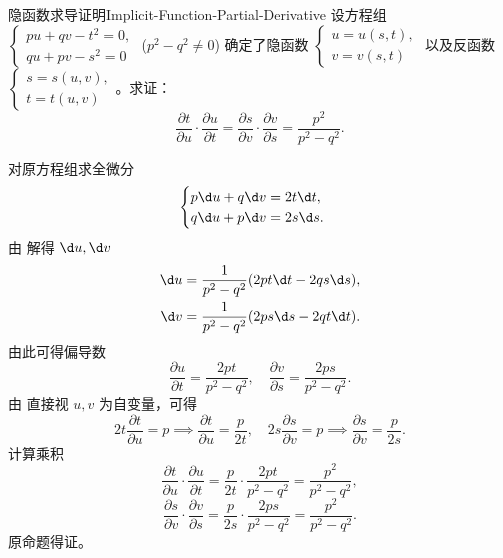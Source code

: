 \begin{problem}{隐函数求导证明}{Implicit-Function-Partial-Derivative}
    设方程组 $\begin{cases} pu + qv - t^2 = 0, \\ qu + pv - s^2 = 0 \end{cases}$ ($p^2 - q^2 \neq 0$) 确定了隐函数 $\begin{cases} u = u(s, t), \\ v = v(s, t) \end{cases}$ 以及反函数 $\begin{cases} s = s(u, v), \\ t = t(u, v) \end{cases}$。求证：
    \begin{equation}
        \frac{\partial t}{\partial u} \cdot \frac{\partial u}{\partial t} = \frac{\partial s}{\partial v} \cdot \frac{\partial v}{\partial s} = \frac{p^2}{p^2 - q^2}.
    \end{equation}
\end{problem}

\begin{myproof}
    对原方程组求全微分
    \begin{equation}
        \label{eq:diff-system}
        \begin{cases}
            p \d u + q \d v = 2t \d t, \\
            q \d u + p \d v = 2s \d s.
        \end{cases}
    \end{equation}
    由  解得 $\d u, \d v$
    \begin{equation}
        \begin{aligned}
            \d u & = \frac{1}{p^2 - q^2} (2pt \d t - 2qs \d s), \\
            \d v & = \frac{1}{p^2 - q^2} (2ps \d s - 2qt \d t).
        \end{aligned}
    \end{equation}
    由此可得偏导数
    \begin{equation}
        \frac{\partial u}{\partial t} = \frac{2pt}{p^2 - q^2}, \quad \frac{\partial v}{\partial s} = \frac{2ps}{p^2 - q^2}.
    \end{equation}
    由  直接视 $u, v$ 为自变量，可得
    \begin{equation}
        2t \frac{\partial t}{\partial u} = p \implies \frac{\partial t}{\partial u} = \frac{p}{2t}, \quad 2s \frac{\partial s}{\partial v} = p \implies \frac{\partial s}{\partial v} = \frac{p}{2s}.
    \end{equation}
    计算乘积
    \begin{equation}
        \frac{\partial t}{\partial u} \cdot \frac{\partial u}{\partial t} = \frac{p}{2t} \cdot \frac{2pt}{p^2 - q^2} = \frac{p^2}{p^2 - q^2},
    \end{equation}
    \begin{equation}
        \frac{\partial s}{\partial v} \cdot \frac{\partial v}{\partial s} = \frac{p}{2s} \cdot \frac{2ps}{p^2 - q^2} = \frac{p^2}{p^2 - q^2}.
    \end{equation}
    原命题得证。
\end{myproof}

\endinput
